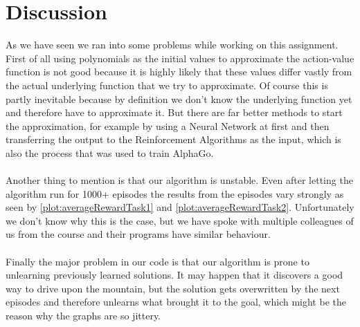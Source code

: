 \documentclass{article}
\begin{document}
	\section{Discussion}
	As we have seen we ran into some problems while working on this assignment. First of all using polynomials as the initial values to approximate the action-value function is not good because it is highly likely that these values differ vastly from the actual underlying function that we try to approximate. Of course this is partly inevitable because by definition we don't know the underlying function yet and therefore have to approximate it. But there are far better methods to start the approximation, for example by using a Neural Network at first and then transferring the output to the Reinforcement Algorithms as the input, which is also the process that was used to train AlphaGo. \\
	\\
	Another thing to mention is that our algorithm is unstable. Even after letting the algorithm run for 1000+ episodes the results from the episodes vary strongly as seen by \autoref{plot:averageRewardTask1} and \autoref{plot:averageRewardTask2}. Unfortunately we don't know why this is the case, but we have spoke with multiple colleagues of us from the course and their programs have similar behaviour. \\
	\\
	Finally the major problem in our code is that our algorithm is prone to unlearning previously learned solutions. It may happen that it discovers a good way to drive upon the mountain, but the solution gets overwritten by the next episodes and therefore unlearns what brought it to the goal, which might be the reason why the graphs are so jittery. 
	
	
	
	
\end{document}
